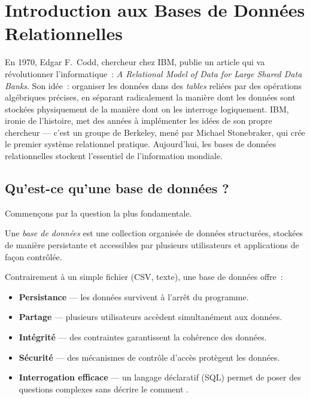 \chapter{Introduction aux Bases de Donn\'ees Relationnelles}
\label{ch:introduction}

En 1970, Edgar F.\ Codd, chercheur chez IBM, publie un article qui va
r\'evolutionner l'informatique~: \emph{A Relational Model of Data for Large
Shared Data Banks}. Son id\'ee~: organiser les donn\'ees dans des
\emph{tables} reli\'ees par des op\'erations alg\'ebriques pr\'ecises, en
s\'eparant radicalement la mani\`ere dont les donn\'ees sont stock\'ees
physiquement de la mani\`ere dont on les interroge logiquement. IBM, ironie
de l'histoire, met des ann\'ees \`a impl\'ementer les id\'ees de son propre
chercheur --- c'est un groupe de Berkeley, men\'e par Michael Stonebraker,
qui cr\'ee le premier syst\`eme relationnel pratique. Aujourd'hui, les bases
de donn\'ees relationnelles stockent l'essentiel de l'information mondiale.

\section{Qu'est-ce qu'une base de donn\'ees ?}

Commen\c{c}ons par la question la plus fondamentale.

\begin{definition}
Une \emph{base de donn\'ees} est une collection organis\'ee de donn\'ees
structur\'ees, stock\'ees de mani\`ere persistante et accessibles
par plusieurs utilisateurs et applications de fa\c{c}on contr\^ol\'ee.
\end{definition}

Contrairement \`a un simple fichier (CSV, texte), une base de donn\'ees offre~:
\begin{itemize}
    \item \textbf{Persistance} --- les donn\'ees survivent \`a l'arr\^et du programme.
    \item \textbf{Partage} --- plusieurs utilisateurs acc\`edent simultan\'ement aux donn\'ees.
    \item \textbf{Int\'egrit\'e} --- des contraintes garantissent la coh\'erence des donn\'ees.
    \item \textbf{S\'ecurit\'e} --- des m\'ecanismes de contr\^ole d'acc\`es prot\`egent les donn\'ees.
    \item \textbf{Interrogation efficace} --- un langage d\'eclaratif (SQL) permet de
          poser des questions complexes sans d\'ecrire le \og comment \fg.
\end{itemize}

